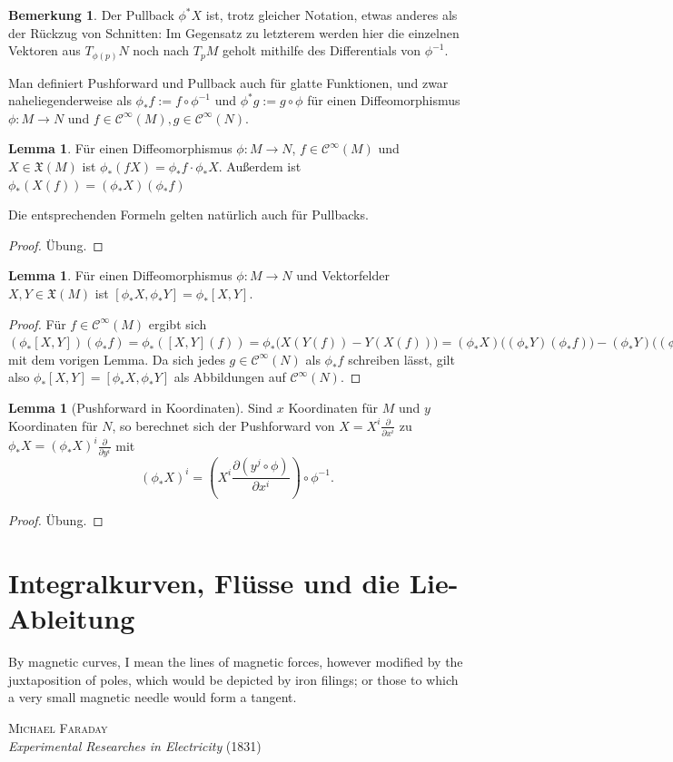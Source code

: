 \documentclass[a4paper]{scrreprt}
\numberwithin{equation}{chapter}
\newcommand{\sC}{\mathcal{C}^{\infty}}
\theoremstyle{definition}
\newtheorem{lemma}[defn]{Lemma}
\newtheorem{bem}[defn]{Bemerkung}
\newcommand{\bewUeb}{\begin{proof}Übung.\end{proof}}
\begin{document}
\begin{bem}
	Der Pullback $\phi^*X$ ist, trotz gleicher Notation, etwas anderes als der Rückzug von Schnitten: Im Gegensatz zu letzterem werden hier die einzelnen Vektoren aus $T_{\phi(p)}N$ noch nach $T_pM$ geholt mithilfe des Differentials von $\phi^{-1}$.
\end{bem}

Man definiert Pushforward und Pullback auch für glatte Funktionen, und zwar naheliegenderweise als $\phi_*f := f \circ \phi^{-1}$ und $\phi^*g := g \circ \phi$ für einen Diffeomorphismus $\phi\colon M \to N$ und $f \in \sC(M), g \in \sC(N)$.

\begin{lemma} \label{lemma:transport_VF_funk}
	Für einen Diffeomorphismus $\phi\colon M \to N$, $f \in \sC(M)$ und $X \in \mathfrak X(M)$ ist $\phi_*(f X) = \phi_*f \cdot \phi_*X$. Außerdem ist $\phi_*(X(f)) = (\phi_*X)(\phi_*f)$

	Die entsprechenden Formeln gelten natürlich auch für Pullbacks.
	\bewUeb
\end{lemma}

\begin{lemma}
	Für einen Diffeomorphismus $\phi\colon M \to N$ und Vektorfelder $X, Y \in \mathfrak X(M)$ ist $[\phi_*X,\phi_*Y] = \phi_*[X,Y]$.

	\begin{proof}
		Für $f \in \sC(M)$ ergibt sich $(\phi_*[X,Y])(\phi_*f) = \phi_*([X,Y](f)) = \phi_*\Big(X(Y(f)) - Y(X(f))\Big) = (\phi_*X)\Big((\phi_*Y)(\phi_*f)\Big) - (\phi_*Y)\Big((\phi_*X)(\phi_*f)\Big) = [\phi_*X,\phi_*Y](\phi_*f)$ mit dem vorigen Lemma. Da sich jedes $g\in \sC(N)$ als $\phi_*f$ schreiben lässt, gilt also $\phi_*[X,Y] = [\phi_*X,\phi_*Y]$ als Abbildungen auf $\sC(N)$.
	\end{proof}
\end{lemma}

\begin{lemma}[Pushforward in Koordinaten]
	Sind $x$ Koordinaten für $M$ und $y$ Koordinaten für $N$, so berechnet sich der Pushforward von $X = X^i \frac{\partial}{\partial x^i}$ zu $\phi_*X = (\phi_*X)^i \frac{\partial}{\partial y^i}$ mit
	\[(\phi_*X)^i = \left(X^i \frac{\partial (y^j \circ \phi)}{\partial x^i}\right) \circ \phi^{-1}.\]
	\bewUeb
\end{lemma}

\section{Integralkurven, Flüsse und die Lie-Ableitung}
\epigraph{By magnetic curves, I mean the lines of magnetic forces, however modified by the juxtaposition of poles, which would be depicted by iron filings; or those to which a very small magnetic needle would form a tangent.}
{\textsc{Michael Faraday}\\\emph{Experimental Researches in Electricity} (1831)}
\end{document}
